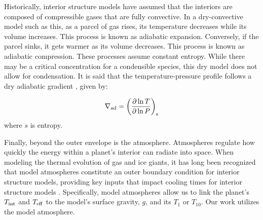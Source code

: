 \documentclass[11pt]{ucscthesisbs}
\begin{document}
Historically, interior structure models have assumed that the interiors are composed of compressible gases that are fully convective. In a dry-convective model such as this, as a parcel of gas rises, its temperature decreases while its volume increases. This process is known as adiabatic expansion. Conversely, if the parcel sinks, it gets warmer as its volume decreases. This process is known as adiabatic compression. These processes assume constant entropy. While there may be a critical concentration for a condensible species, this dry model does not allow for condensation. It is said that the temperature-pressure profile follows a dry adiabatic gradient \citep{kippenhahn_2012}, given by:

\begin{equation}
  \nabla_{\rm ad} = \left( \frac{\partial \ln T}{\partial \ln P} \right)_{\rm s}
\end{equation}
where $s$ is entropy.

Finally, beyond the outer envelope is the atmosphere. Atmospheres regulate how quickly the energy within a planet's interior can radiate into space. When modeling the thermal evolution of gas and ice giants, it has long been recognized that model atmospheres constitute an outer boundary condition for interior structure models, providing key inputs that impact cooling times for interior structure models \citep{graboske_1975,fortney_2011}. Specifically, model atmospheres allow us to link the planet's $T_{\rm int}$ and $T_{\rm eff}$ to the model's surface gravity, $g$, and its $T_{1}$ or $T_{10}$. Our work utilizes the \citep{fortney_2011} model atmosphere. 
\end{document}
